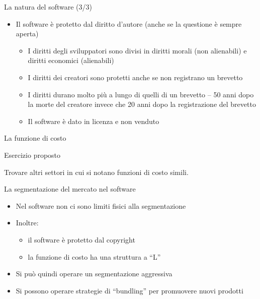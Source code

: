\documentclass{beamer}
\begin{document}
\begin{frame}
{\centerline{La natura del software (3/3)}}
\begin{itemize}
    \item Il software \`{e} protetto dal diritto d'autore (anche se la questione \`{e} sempre aperta)
\begin{itemize}
    \item I diritti degli sviluppatori sono divisi in diritti morali (non alienabili) e diritti economici (alienabili)
    \item I diritti dei creatori sono protetti anche se non registrano un brevetto 
    \item I diritti durano molto pi\`{u} a lungo di quelli di un brevetto -- 50 anni dopo la morte del creatore invece che 20 anni dopo la registrazione del brevetto 
    \item Il software \`{e} dato in licenza e non venduto
\end{itemize} 
\end{itemize} 

\end{frame}

\begin{frame}
{\centerline{La funzione di costo}}
\begin{center}
    
\end{center}

\end{frame}

\begin{frame}
{\centerline{Esercizio proposto}}
\vspace{1cm}
\begin{center}
    \LARGE{Trovare altri settori in cui si notano funzioni di costo simili.}
\end{center}

\end{frame}


\begin{frame}
{\centerline{La segmentazione del mercato nel software}}
\begin{itemize}
\item Nel software non ci sono limiti fisici alla segmentazione
\item Inoltre:
\begin{itemize}
\item il software \`{e} protetto dal copyright
\item la funzione di costo ha una struttura a ``L''
\end{itemize}
\item Si pu\`{o} quindi operare un segmentazione aggressiva
\item Si possono operare strategie di ``bundling'' per promuovere nuovi prodotti
\end{itemize}

\end{frame}
\end{document}
